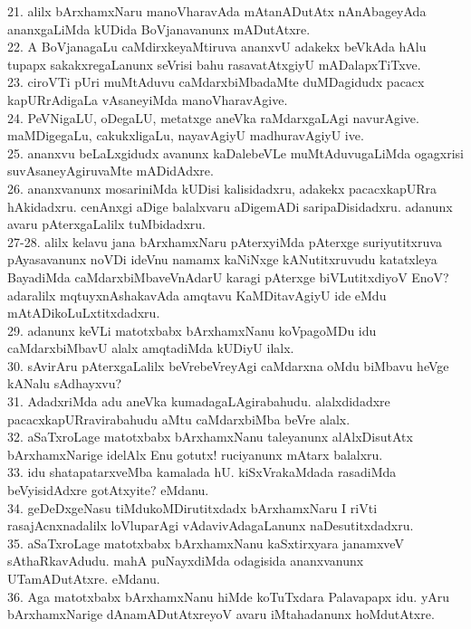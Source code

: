 \documentclass{article}
\begin{document}
21. alilx bArxhamxNaru manoVharavAda mAtanADutAtx nAnAbageyAda ananxgaLiMda kUDida BoVjanavanunx mADutAtxre.\\
22. A BoVjanagaLu caMdirxkeyaMtiruva ananxvU adakekx beVkAda hAlu tupapx sakakxregaLanunx seVrisi bahu rasavatAtxgiyU mADalapxTiTxve.\\
23. ciroVTi pUri muMtAduvu caMdarxbiMbadaMte duMDagidudx pacacx kapURrAdigaLa vAsaneyiMda manoVharavAgive.\\
24. PeVNigaLU, oDegaLU, metatxge aneVka raMdarxgaLAgi navurAgive. maMDigegaLu, cakukxligaLu, nayavAgiyU madhuravAgiyU ive.\\
25. ananxvu beLaLxgidudx avanunx kaDalebeVLe muMtAduvugaLiMda ogagxrisi suvAsaneyAgiruvaMte mADidAdxre.\\
26. ananxvanunx mosariniMda kUDisi kalisidadxru, adakekx pacacxkapURra hAkidadxru. cenAnxgi aDige balalxvaru aDigemADi saripaDisidadxru. adanunx avaru pAterxgaLalilx tuMbidadxru.\\
27-28. alilx kelavu jana bArxhamxNaru pAterxyiMda pAterxge suriyutitxruva pAyasavanunx noVDi ideVnu namamx kaNiNxge kANutitxruvudu katatxleya BayadiMda caMdarxbiMbaveVnAdarU karagi pAterxge biVLutitxdiyoV EnoV? adaralilx mqtuyxnAshakavAda amqtavu KaMDitavAgiyU ide eMdu mAtADikoLuLxtitxdadxru.\\
29. adanunx keVLi matotxbabx bArxhamxNanu koVpagoMDu idu caMdarxbiMbavU alalx amqtadiMda kUDiyU ilalx.\\
30. sAvirAru pAterxgaLalilx beVrebeVreyAgi caMdarxna oMdu biMbavu heVge kANalu sAdhayxvu?\\
31. AdadxriMda adu aneVka kumadagaLAgirabahudu. alalxdidadxre pacacxkapURravirabahudu aMtu caMdarxbiMba beVre alalx.\\
32. aSaTxroLage matotxbabx bArxhamxNanu taleyanunx alAlxDisutAtx bArxhamxNarige idelAlx Enu gotutx! ruciyanunx mAtarx balalxru.\\
33. idu shatapatarxveMba kamalada hU.  kiSxVrakaMdada rasadiMda beVyisidAdxre gotAtxyite? eMdanu.\\
34. geDeDxgeNasu tiMdukoMDirutitxdadx bArxhamxNaru I riVti rasajAcnxnadalilx loVluparAgi vAdavivAdagaLanunx naDesutitxdadxru.\\
35. aSaTxroLage matotxbabx bArxhamxNanu kaSxtirxyara janamxveV sAthaRkavAdudu. mahA puNayxdiMda odagisida ananxvanunx UTamADutAtxre. eMdanu.\\
36. Aga matotxbabx bArxhamxNanu hiMde koTuTxdara Palavapapx idu. yAru bArxhamxNarige dAnamADutAtxreyoV avaru iMtahadanunx hoMdutAtxre.\\
\end{document}
